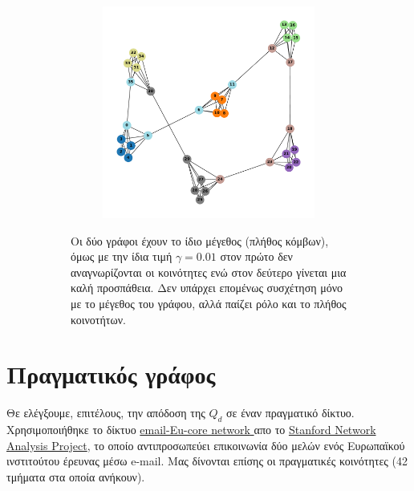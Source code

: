 \documentclass[12pt, letterpaper]{article}
\begin{document}
\begin{figure}
\begin{subfigure}{0.66\linewidth}
\begin{subfigure}{0.45\linewidth}
        \label{}
    \end{subfigure}
    \begin{subfigure}{0.45\linewidth}
        \centering
        \includegraphics[width=\linewidth]{nonconnected_ssize_dcs0.012.pdf}
        \label{}
    \end{subfigure}
    \caption{Οι δύο γράφοι έχουν το ίδιο μέγεθος (πλήθος κόμβων), όμως με την ίδια τιμή 
    $\gamma = 0.01$ στον πρώτο δεν αναγνωρίζονται οι κοινότητες ενώ στον δεύτερο γίνεται 
    μια καλή προσπάθεια. Δεν υπάρχει επομένως συσχέτηση μόνο με το μέγεθος του γράφου, 
    αλλά παίζει ρόλο και το πλήθος κοινοτήτων.}
    \label{ss_dcs}
  \end{subfigure}
  \caption{}
  \label{endplots}
\end{figure}









\section{Πραγματικός γράφος}

Θε ελέγξουμε, επιτέλους, την απόδοση της $Q_d$ σε έναν πραγματικό δίκτυο. 
Χρησιμοποιήθηκε το δίκτυο \href{https://snap.stanford.edu/data/email-Eu-core.html}{
  \textlatin{email-Eu-core network}
} απο το \href{https://snap.stanford.edu/index.html}{\textlatin{Stanford Network Analysis Project}},
το οποίο αντιπροσωπεύει επικοινωνία δύο μελών ενός Ευρωπαϊκού ινστιτούτου
έρευνας μέσω \textlatin{e-mail}. 
Μας δίνονται επίσης οι πραγματικές κοινότητες (42 τμήματα στα οποία ανήκουν).
\end{document}
